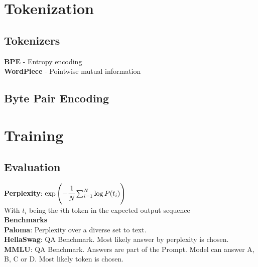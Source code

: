 \begin{multicols}{2}
    \section{Tokenization}
    \begin{mdframed}[style=eqbox]
        \subsection{Tokenizers}
        \textbf{BPE} - Entropy encoding\\
        \textbf{WordPiece} - Pointwise mutual information
    \end{mdframed}
    \begin{mdframed}[style=eqbox]
        \subsection{Byte Pair Encoding}

    \end{mdframed}

    \section{Training}
    \begin{mdframed}[style=eqbox]
        \subsection{Evaluation}
        \textbf{Perplexity}: $\exp\left( - \cfrac{1}{N} \sum_{i=1}^{N} \log P(t_i)\right)$\\
        {\tiny With $t_i$ being the $i$th token in the expected output sequence}\\[1em]
        \textbf{Benchmarks}\\
        \textbf{Paloma}: Perplexity over a diverse set to text.\\
        \textbf{HellaSwag}: QA Benchmark. Most likely answer by perplexity is chosen.\\
        \textbf{MMLU}: QA Benchmark. Answers are part of the Prompt. Model can answer A, B, C or D. Most likely token is chosen.
    \end{mdframed}

    \begin{mdframed}[style=eqbox]

\end{mdframed}
\end{multicols}

